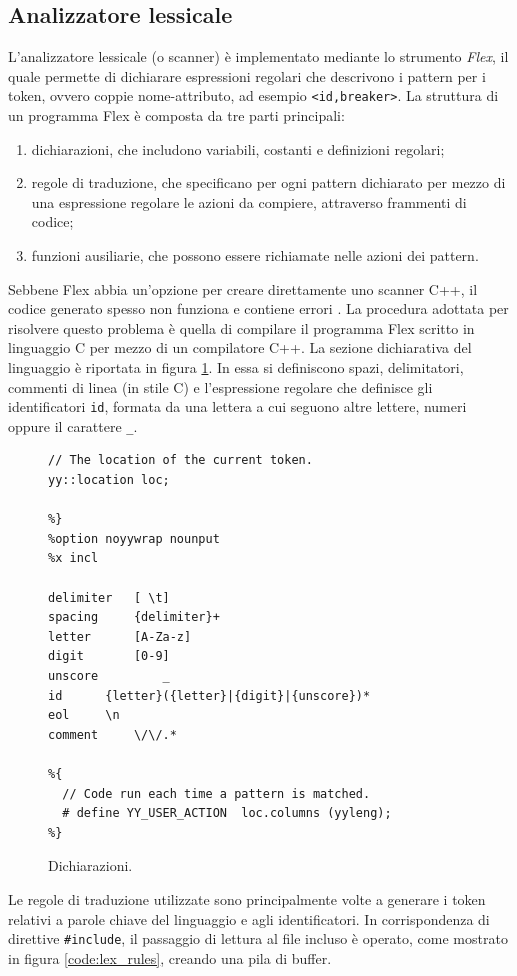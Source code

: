 \subsection{Analizzatore lessicale}
L'analizzatore lessicale (o scanner) è implementato mediante lo strumento \emph{Flex}, il quale permette di dichiarare espressioni regolari che descrivono i pattern per i token, ovvero coppie nome-attributo, ad esempio \verb|<id,breaker>|. La struttura di un programma Flex  è composta da tre parti principali:
\begin{enumerate}
\item dichiarazioni, che includono variabili, costanti e definizioni regolari;
\item regole di traduzione, che specificano per ogni pattern dichiarato per mezzo di una espressione regolare le azioni da compiere, attraverso frammenti di codice;
\item funzioni ausiliarie, che possono essere richiamate nelle azioni dei pattern.
\end{enumerate}
Sebbene Flex abbia un'opzione per creare direttamente uno scanner C++, il codice generato spesso non funziona e contiene errori \cite{book:bison} .
La procedura adottata per risolvere questo problema è quella di compilare il programma Flex scritto in linguaggio C per mezzo di un compilatore C++.
La sezione dichiarativa del linguaggio è riportata in figura \ref{code:lex_decl}. In essa si definiscono spazi, delimitatori, commenti di linea (in stile C) e l'espressione regolare che definisce gli identificatori \verb|id|, formata da una lettera a cui seguono altre lettere, numeri oppure il carattere \verb|_|.

\begin{figure}[htbp]
\begin{verbatim}
// The location of the current token.
yy::location loc;

%}
%option noyywrap nounput
%x incl

delimiter	[ \t]
spacing		{delimiter}+
letter		[A-Za-z]
digit		[0-9]
unscore         _
id		{letter}({letter}|{digit}|{unscore})*
eol		\n
comment		\/\/.*

%{
  // Code run each time a pattern is matched.
  # define YY_USER_ACTION  loc.columns (yyleng);
%}
\end{verbatim}
\caption{Dichiarazioni.}
\label{code:lex_decl}
\end{figure}

Le regole di traduzione utilizzate sono principalmente volte a generare i token relativi a parole chiave del linguaggio e agli identificatori.
In corrispondenza di direttive \verb|#include|, il passaggio di lettura al file incluso è operato, come mostrato in figura \ref{code:lex_rules}, creando una pila di buffer. 


